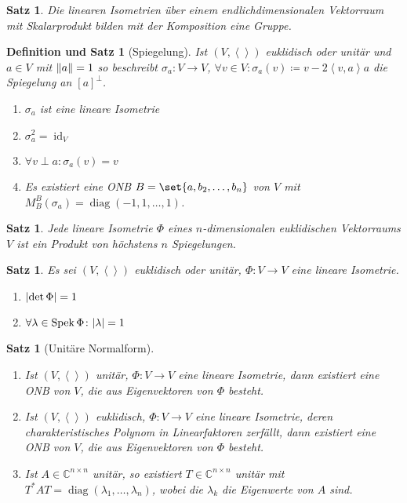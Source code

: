 \documentclass[a4paper]{article}
\theoremstyle{marginbreak}
\newtheorem{satz}[definition]{Satz}
\newtheorem{defsatz}[definition]{Definition und Satz}
\DeclareMathOperator{\id}{id}
\DeclareMathOperator{\Spek}{Spek}
\DeclareMathOperator{\diag}{diag}
\newcommand\scp[1]{\left\langle#1\right\rangle}
\begin{document}
	\begin{satz}
		Die linearen Isometrien über einem endlichdimensionalen Vektorraum mit Skalarprodukt bilden
		mit der Komposition eine Gruppe.
	\end{satz}
	\begin{defsatz}[Spiegelung]
		Ist $(V, \scp{})$ euklidisch oder unitär und $a\in V$ mit $\norm{a} = 1$ so beschreibt
		$\sigma_a\colon V\to V$, $\forall v\in V\colon\sigma_a(v)\coloneqq v - 2\scp{v, a}a$ die
		Spiegelung an $[a]^\perp$.
		\begin{enumerate}[label=(\alph*)]
			\item $\sigma_a$ ist eine lineare Isometrie
			\item $\sigma_a^2 = \id_V$
			\item $\forall v\perp a\colon \sigma_a(v)=v$
			\item Es existiert eine ONB $B = \set{a, b_2,\ldots,b_n}$ von $V$ mit $M_B^B(\sigma_a) = \diag(-1, 1, \ldots, 1)$.
		\end{enumerate}
	\end{defsatz}
	\begin{satz}
		Jede lineare Isometrie $\Phi$ eines $n$-dimensionalen euklidischen Vektorraums $V$ ist
		ein Produkt von höchstens $n$ Spiegelungen.
	\end{satz}
	\begin{satz}
		Es sei $(V, \scp{})$ euklidisch oder unitär, $\Phi\colon V\to V$ eine lineare Isometrie.
		\begin{enumerate}[label=(\alph*)]
			\item $\abs{\det\Phi} = 1$
			\item $\forall \lambda\in\Spek\Phi\colon\abs{\lambda}=1$
		\end{enumerate}
	\end{satz}
	\begin{satz}[Unitäre Normalform]
		\begin{enumerate}[label=(\alph*)]
			\item Ist $(V, \scp{})$ unitär, $\Phi\colon V\to V$ eine lineare Isometrie, dann existiert
				eine ONB von $V$, die aus Eigenvektoren von $\Phi$ besteht.
			\item Ist $(V, \scp{})$ euklidisch, $\Phi\colon V\to V$ eine lineare Isometrie, deren charakteristisches
				Polynom in Linearfaktoren zerfällt, dann existiert eine ONB von $V$, die aus Eigenvektoren von $\Phi$
				besteht.
			\item Ist $A\in\mathbb{C}^{n\times n}$ unitär, so existiert $T\in\mathbb{C}^{n\times n}$ unitär mit
				$T^*AT=\diag(\lambda_1,\ldots,\lambda_n)$, wobei die $\lambda_k$ die Eigenwerte von $A$ sind.
		\end{enumerate}
	\end{satz}
\end{document}
